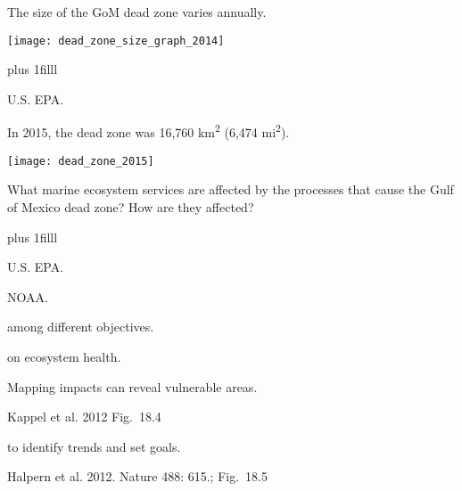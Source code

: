 \documentclass[t]{beamer}
\begin{document}
\begin{frame}[t]{The size of the GoM dead zone varies annually.}

	\texttt{[image: dead\_zone\_size\_graph\_2014]}
	
	\vskip0pt plus 1filll

\hfill\tiny U.S. EPA.
\end{frame}

\begin{frame}[t]{In 2015, the dead zone was 16,760 km\textsuperscript{2} (6,474 mi\textsuperscript{2}).}

	\texttt{[image: dead\_zone\_2015]}
	
	{\large What marine ecosystem services are affected by the processes that cause the Gulf of Mexico dead zone? How are they affected?}
	
	\vskip0pt plus 1filll

\hfill\tiny U.S. EPA.
\end{frame}



{
\begin{frame}[b]
\hfill\tiny NOAA.
\end{frame}
}



{
\begin{frame}[t]{ among different objectives.}
\end{frame}
}

{
\begin{frame}[t]{ on ecosystem health.}
\end{frame}
}

{
\begin{frame}[b]{Mapping impacts can reveal vulnerable areas.}

\tiny Kappel et al. 2012 \hfill Fig.~18.4
\end{frame}
}

{
\begin{frame}[b]{ to identify trends and set goals.}

\tiny\hfill Halpern et al. 2012. Nature 488: 615.; Fig.~18.5
\end{frame}
}
\end{document}
